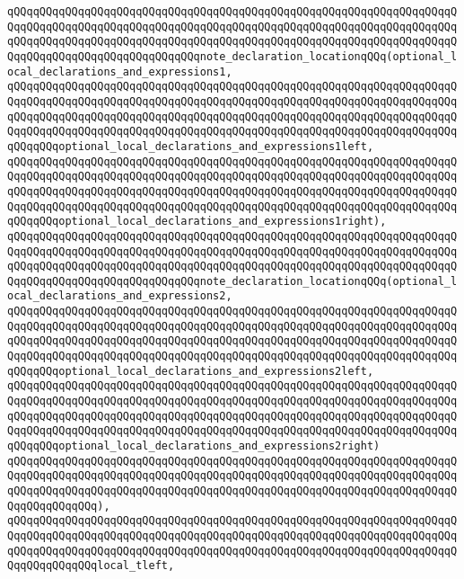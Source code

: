 \verb|qQQqqQQqqQQqqQQqqQQqqQQqqQQqqQQqqQQqqQQqqQQqqQQqqQQqqQQqqQQqqQQqqQQqqQQqqQQqqQQqqQQqqQQqqQQqqQQqqQQqqQQqqQQqqQQqqQQqqQQqqQQqqQQqqQQqqQQqqQQqqQQqqQQqqQQqqQQqqQQqqQQqqQQqqQQqqQQqqQQqqQQqqQQqqQQqqQQqqQQqqQQqqQQqqQQqqQQqqQQqqQQqqQQqqQQqqQQqqQQqnote_declaration_locationqQQq(optional_local_declarations_and_expressions1,|\newline
\verb|qQQqqQQqqQQqqQQqqQQqqQQqqQQqqQQqqQQqqQQqqQQqqQQqqQQqqQQqqQQqqQQqqQQqqQQqqQQqqQQqqQQqqQQqqQQqqQQqqQQqqQQqqQQqqQQqqQQqqQQqqQQqqQQqqQQqqQQqqQQqqQQqqQQqqQQqqQQqqQQqqQQqqQQqqQQqqQQqqQQqqQQqqQQqqQQqqQQqqQQqqQQqqQQqqQQqqQQqqQQqqQQqqQQqqQQqqQQqqQQqqQQqqQQqqQQqqQQqqQQqqQQqqQQqqQQqqQQqqQQqqQQqqQQqoptional_local_declarations_and_expressions1left,|\newline
\verb|qQQqqQQqqQQqqQQqqQQqqQQqqQQqqQQqqQQqqQQqqQQqqQQqqQQqqQQqqQQqqQQqqQQqqQQqqQQqqQQqqQQqqQQqqQQqqQQqqQQqqQQqqQQqqQQqqQQqqQQqqQQqqQQqqQQqqQQqqQQqqQQqqQQqqQQqqQQqqQQqqQQqqQQqqQQqqQQqqQQqqQQqqQQqqQQqqQQqqQQqqQQqqQQqqQQqqQQqqQQqqQQqqQQqqQQqqQQqqQQqqQQqqQQqqQQqqQQqqQQqqQQqqQQqqQQqqQQqqQQqqQQqqQQqoptional_local_declarations_and_expressions1right),|\newline
\verb|qQQqqQQqqQQqqQQqqQQqqQQqqQQqqQQqqQQqqQQqqQQqqQQqqQQqqQQqqQQqqQQqqQQqqQQqqQQqqQQqqQQqqQQqqQQqqQQqqQQqqQQqqQQqqQQqqQQqqQQqqQQqqQQqqQQqqQQqqQQqqQQqqQQqqQQqqQQqqQQqqQQqqQQqqQQqqQQqqQQqqQQqqQQqqQQqqQQqqQQqqQQqqQQqqQQqqQQqqQQqqQQqqQQqqQQqqQQqqQQqnote_declaration_locationqQQq(optional_local_declarations_and_expressions2,|\newline
\verb|qQQqqQQqqQQqqQQqqQQqqQQqqQQqqQQqqQQqqQQqqQQqqQQqqQQqqQQqqQQqqQQqqQQqqQQqqQQqqQQqqQQqqQQqqQQqqQQqqQQqqQQqqQQqqQQqqQQqqQQqqQQqqQQqqQQqqQQqqQQqqQQqqQQqqQQqqQQqqQQqqQQqqQQqqQQqqQQqqQQqqQQqqQQqqQQqqQQqqQQqqQQqqQQqqQQqqQQqqQQqqQQqqQQqqQQqqQQqqQQqqQQqqQQqqQQqqQQqqQQqqQQqqQQqqQQqqQQqqQQqqQQqqQQqoptional_local_declarations_and_expressions2left,|\newline
\verb|qQQqqQQqqQQqqQQqqQQqqQQqqQQqqQQqqQQqqQQqqQQqqQQqqQQqqQQqqQQqqQQqqQQqqQQqqQQqqQQqqQQqqQQqqQQqqQQqqQQqqQQqqQQqqQQqqQQqqQQqqQQqqQQqqQQqqQQqqQQqqQQqqQQqqQQqqQQqqQQqqQQqqQQqqQQqqQQqqQQqqQQqqQQqqQQqqQQqqQQqqQQqqQQqqQQqqQQqqQQqqQQqqQQqqQQqqQQqqQQqqQQqqQQqqQQqqQQqqQQqqQQqqQQqqQQqqQQqqQQqqQQqqQQqoptional_local_declarations_and_expressions2right)|\newline
\verb|qQQqqQQqqQQqqQQqqQQqqQQqqQQqqQQqqQQqqQQqqQQqqQQqqQQqqQQqqQQqqQQqqQQqqQQqqQQqqQQqqQQqqQQqqQQqqQQqqQQqqQQqqQQqqQQqqQQqqQQqqQQqqQQqqQQqqQQqqQQqqQQqqQQqqQQqqQQqqQQqqQQqqQQqqQQqqQQqqQQqqQQqqQQqqQQqqQQqqQQqqQQqqQQqqQQqqQQqqQQqqQQq),|\newline
\verb|qQQqqQQqqQQqqQQqqQQqqQQqqQQqqQQqqQQqqQQqqQQqqQQqqQQqqQQqqQQqqQQqqQQqqQQqqQQqqQQqqQQqqQQqqQQqqQQqqQQqqQQqqQQqqQQqqQQqqQQqqQQqqQQqqQQqqQQqqQQqqQQqqQQqqQQqqQQqqQQqqQQqqQQqqQQqqQQqqQQqqQQqqQQqqQQqqQQqqQQqqQQqqQQqqQQqqQQqqQQqqQQqlocal_tleft,|\newline
